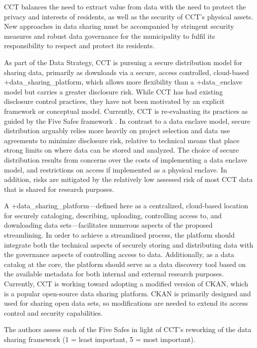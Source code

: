 \documentclass[
]{WileySix}
\begin{document}
CCT balances the need to extract value from data with the need to protect the privacy and interests of residents, as well as the security of CCT's physical assets. New approaches in data sharing must be accompanied by stringent security measures and robust data governance for the municipality to fulfil its responsibility to respect and protect its residents.

As part of the Data Strategy, CCT is pursuing a secure distribution model for sharing data, primarily as downloads via a secure, access controlled, cloud-based +data\_sharing\_platform\textbar, which allows more flexibility than a +data\_enclave\textbar{} model but carries a greater disclosure risk. While CCT has had existing disclosure control practices, they have not been motivated by an explicit framework or conceptual model. Currently, CCT is re-evaluating its practices as guided by the Five Safes framework \citep{desai2016}. In contrast to a data enclave model, secure distribution arguably relies more heavily on project selection and data use agreements to minimize disclosure risk, relative to technical means that place strong limits on where data can be stored and analyzed. The choice of secure distribution results from concerns over the costs of implementing a data enclave model, and restrictions on access if implemented as a physical enclave. In addition, risks are mitigated by the relatively low assessed risk of most CCT data that is shared for research purposes.

A +data\_sharing\_platform\textbar---defined here as a centralized, cloud-based location for securely cataloging, describing, uploading, controlling access to, and downloading data sets---facilitates numerous aspects of the proposed streamlining. In order to achieve a streamlined process, the platform should integrate both the technical aspects of securely storing and distributing data with the governance aspects of controlling access to data. Additionally, as a data catalog at the core, the platform should serve as a data discovery tool based on the available metadata for both internal and external research purposes. Currently, CCT is working toward adopting a modified version of CKAN, which is a popular open-source data sharing platform. CKAN is primarily designed and used for sharing open data sets, so modifications are needed to extend its access control and security capabilities.

The authors assess each of the Five Safes in light of CCT's reworking of the data sharing framework (1 = least important, 5 = most important).
\end{document}
